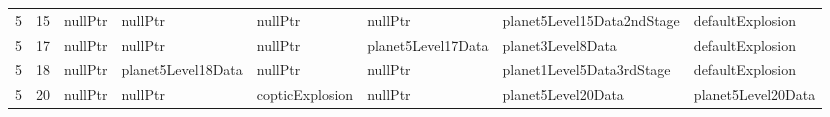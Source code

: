 \begin{tabular}{rrllllll}
      5 &      15 & nullPtr                  & nullPtr                      & nullPtr                      & nullPtr                   & planet5Level15Data2ndStage & defaultExplosion           \\
      5 &      17 & nullPtr                  & nullPtr                      & nullPtr                      & planet5Level17Data        & planet3Level8Data          & defaultExplosion           \\
      5 &      18 & nullPtr                  & planet5Level18Data           & nullPtr                      & nullPtr                   & planet1Level5Data3rdStage  & defaultExplosion           \\
      5 &      20 & nullPtr                  & nullPtr                      & copticExplosion              & nullPtr                   & planet5Level20Data         & planet5Level20Data         \\
      \hline
    \end{tabular}

